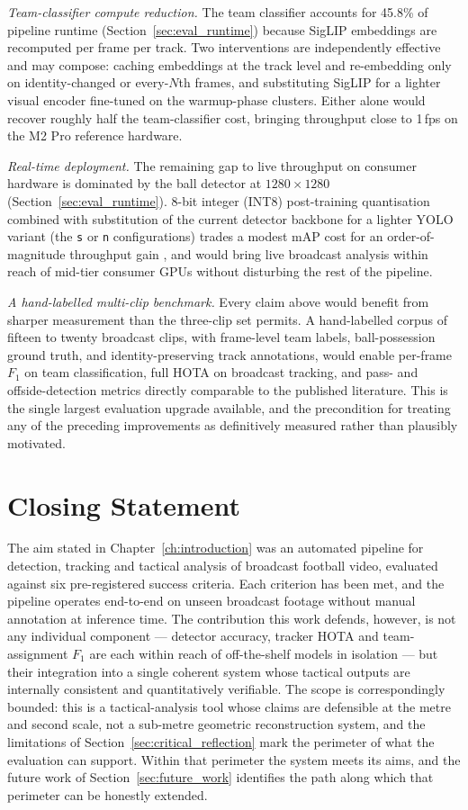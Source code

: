 \textit{Team-classifier compute reduction.} The team classifier accounts for 45.8\%
of pipeline runtime (Section~\ref{sec:eval_runtime}) because SigLIP embeddings are
recomputed per frame per track. Two interventions are independently effective and
may compose: caching embeddings at the track level and re-embedding only on
identity-changed or every-$N$th frames, and substituting SigLIP for a lighter
visual encoder fine-tuned on the warmup-phase clusters. Either alone would recover
roughly half the team-classifier cost, bringing throughput close to 1\,fps on the
M2 Pro reference hardware.

\textit{Real-time deployment.} The remaining gap to live throughput on
consumer hardware is dominated by the ball detector at $1280\times1280$
(Section~\ref{sec:eval_runtime}). 8-bit integer (INT8) post-training quantisation combined with
substitution of the current detector backbone for a lighter YOLO variant (the
\texttt{s} or \texttt{n} configurations) trades a modest mAP cost for an order-of-magnitude throughput gain
, and would bring live broadcast analysis
within reach of mid-tier consumer GPUs without disturbing the rest of the pipeline.

\textit{A hand-labelled multi-clip benchmark.} Every claim above would benefit from
sharper measurement than the three-clip set permits. A hand-labelled corpus of
fifteen to twenty broadcast clips, with frame-level team labels,
ball-possession ground truth, and identity-preserving track annotations, would
enable per-frame $F_1$ on team classification, full HOTA on broadcast tracking,
and pass- and offside-detection metrics directly comparable to the published
literature. This is the single largest evaluation upgrade available, and the
precondition for treating any of the preceding improvements as definitively
measured rather than plausibly motivated.

\section{Closing Statement}
\label{sec:closing_statement}

The aim stated in Chapter~\ref{ch:introduction} was an automated pipeline for
detection, tracking and tactical analysis of broadcast football video, evaluated
against six pre-registered success criteria.
Each criterion has been met, and the pipeline operates end-to-end on unseen broadcast footage without
manual annotation at inference time. The contribution this work defends, however,
is not any individual component --- detector accuracy, tracker HOTA and
team-assignment $F_1$ are each within reach of off-the-shelf models in isolation
--- but their integration into a single coherent system whose tactical outputs are
internally consistent and quantitatively verifiable. The scope is correspondingly
bounded: this is a tactical-analysis tool whose claims are defensible at the metre and second
scale, not a sub-metre geometric reconstruction system, and the limitations of
Section~\ref{sec:critical_reflection} mark the perimeter of what the evaluation
can support. Within that perimeter the system meets its aims, and the future work
of Section~\ref{sec:future_work} identifies the path along which that perimeter
can be honestly extended.